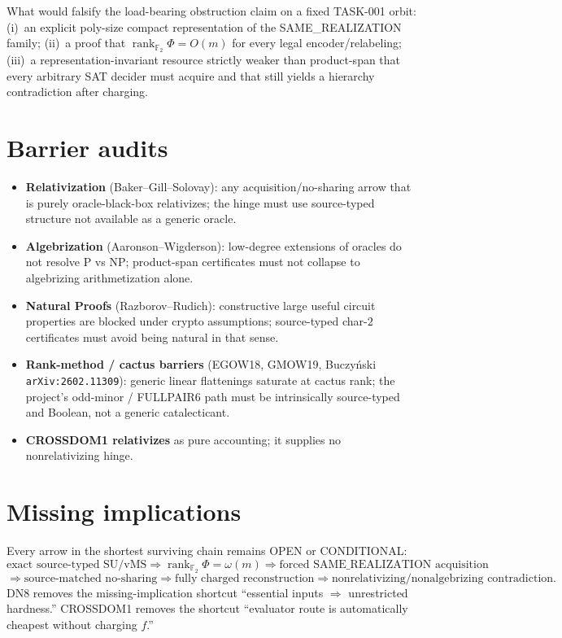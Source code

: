 \documentclass[11pt]{article}
\begin{document}
What would falsify the load-bearing obstruction claim on a fixed TASK-001 orbit:
(i)~an explicit poly-size compact representation of the SAME\_REALIZATION family;
(ii)~a proof that $\operatorname{rank}_{\mathbb F_2}\Phi=O(m)$ for every legal
encoder/relabeling;
(iii)~a representation-invariant resource strictly weaker than product-span that
every arbitrary SAT decider must acquire and that still yields a hierarchy
contradiction after charging.

\section*{Barrier audits}
\begin{itemize}
\item \textbf{Relativization} (Baker--Gill--Solovay): any acquisition/no-sharing
arrow that is purely oracle-black-box relativizes; the hinge must use
source-typed structure not available as a generic oracle.
\item \textbf{Algebrization} (Aaronson--Wigderson): low-degree extensions of
oracles do not resolve P vs NP; product-span certificates must not collapse to
algebrizing arithmetization alone.
\item \textbf{Natural Proofs} (Razborov--Rudich): constructive large useful
circuit properties are blocked under crypto assumptions; source-typed
char-$2$ certificates must avoid being natural in that sense.
\item \textbf{Rank-method / cactus barriers} (EGOW18, GMOW19, Buczy\'nski
\texttt{arXiv:2602.11309}): generic linear flattenings saturate at cactus rank;
the project's odd-minor / FULLPAIR6 path must be intrinsically source-typed and
Boolean, not a generic catalecticant.
\item \textbf{CROSSDOM1 relativizes} as pure accounting; it supplies no
nonrelativizing hinge.
\end{itemize}

\section*{Missing implications}
Every arrow in the shortest surviving chain remains OPEN or CONDITIONAL:
\[
\text{exact source-typed SU/vMS}
\Longrightarrow
\operatorname{rank}_{\mathbb F_2}\Phi=\omega(m)
\Longrightarrow
\text{forced SAME\_REALIZATION acquisition}
\]
\[
\Longrightarrow
\text{source-matched no-sharing}
\Longrightarrow
\text{fully charged reconstruction}
\Longrightarrow
\text{nonrelativizing/nonalgebrizing contradiction}.
\]
DN8 removes the missing-implication shortcut ``essential inputs $\Rightarrow$
unrestricted hardness.'' CROSSDOM1 removes the shortcut ``evaluator route is
automatically cheapest without charging $f$.''
\end{document}
